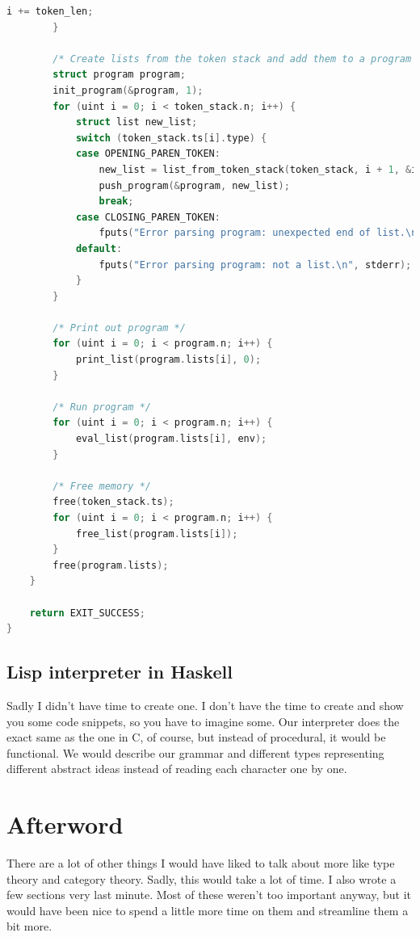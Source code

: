 \documentclass[11pt]{article}
\begin{document}
\begin{lstlisting}[language=C, basicstyle=\tiny]
            i += token_len;
        }
		
        /* Create lists from the token stack and add them to a program */
        struct program program;
        init_program(&program, 1);
        for (uint i = 0; i < token_stack.n; i++) {
            struct list new_list;
            switch (token_stack.ts[i].type) {
            case OPENING_PAREN_TOKEN:
                new_list = list_from_token_stack(token_stack, i + 1, &i);
                push_program(&program, new_list);
                break;
            case CLOSING_PAREN_TOKEN:
                fputs("Error parsing program: unexpected end of list.\n", stderr);
            default:
                fputs("Error parsing program: not a list.\n", stderr);
            }
        }

        /* Print out program */
        for (uint i = 0; i < program.n; i++) {
            print_list(program.lists[i], 0);
        }

        /* Run program */
        for (uint i = 0; i < program.n; i++) {
            eval_list(program.lists[i], env);
        }

        /* Free memory */
        free(token_stack.ts);
        for (uint i = 0; i < program.n; i++) {
            free_list(program.lists[i]);
        }
        free(program.lists);
    }

    return EXIT_SUCCESS;
}
\end{lstlisting}

\subsection{Lisp interpreter in Haskell}

Sadly I didn't have time to create one. I don't have the time to create and
show you some code snippets, so you have to imagine some. Our interpreter does
the exact same as the one in C, of course, but instead of procedural, it would
be functional. We would describe our grammar and different types representing
different abstract ideas instead of reading each character one by one.

\newpage
\thispagestyle{empty}
\mbox{}
\newpage

\newpage
\section*{Afterword}

There are a lot of other things I would have liked to talk about more like type
theory and category theory. Sadly, this would take a lot of time. I also wrote
a few sections very last minute. Most of these weren't too important anyway,
but it would have been nice to spend a little more time on them and streamline
them a bit more.
\end{document}
